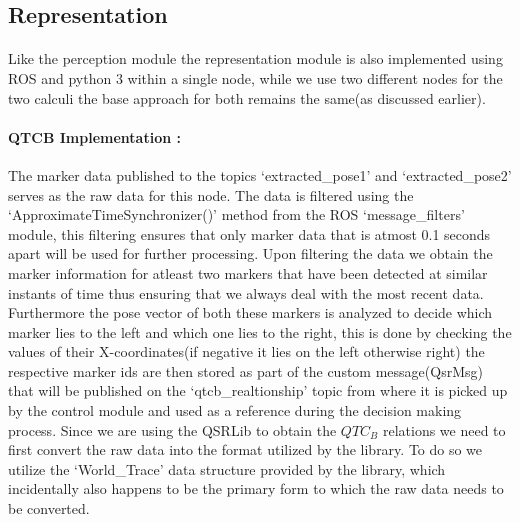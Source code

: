 \subsection{Representation}
\paragraph{} Like the perception module the representation module is also implemented using ROS and python 3 within a single node, while we use two different nodes for the two calculi the base approach for both remains the same(as discussed earlier).

\paragraph{QTCB Implementation :} The marker data published to the topics `extracted\_pose1' and `extracted\_pose2' serves as the raw data for this node. The data is filtered using the `ApproximateTimeSynchronizer()' method from the ROS `message\_filters' module, this filtering ensures that only marker data that is atmost 0.1 seconds apart will be used for further processing. Upon filtering the data we obtain the marker information for atleast two markers that have been detected at similar instants of time thus ensuring that we always deal with the most recent data. Furthermore the pose vector of both these markers is analyzed to decide which marker lies to the left and which one lies to the right, this is done by checking the values of their X-coordinates(if negative it lies on the left otherwise right) the respective marker ids are then stored as part of the custom message(QsrMsg) that will be published on the `qtcb\_realtionship' topic from where it is picked up by the control module and used as a reference during the decision making process. Since we are using the QSRLib to obtain the $QTC_B$ relations we need to first convert the raw data into the format utilized by the library. To do so we utilize the `World\_Trace' data structure provided by the library, which incidentally also happens to be the primary form to which the raw data needs to be converted. 


